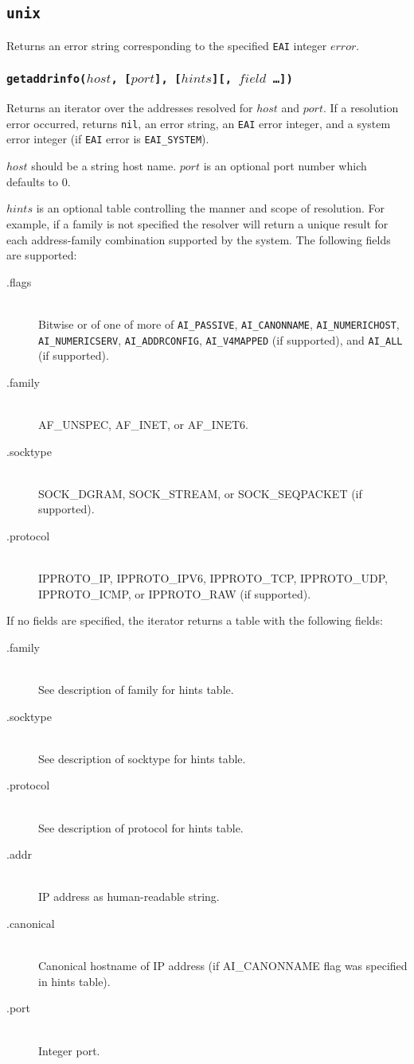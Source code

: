 \documentclass[11pt, oneside]{memoir}
\newcommand*{\nil}[0]{\texttt{nil}\xspace}
\newcommand*{\fn}[1]{\texttt{#1}\xspace}
\newcounter{toccols}
\newenvironment{Module}[1]{
	\subsection{\texttt{#1}}
	\addtocontents{toc}{
		\protect\begin{multicols}{\value{toccols}}
	}
}{
	\addtocontents{toc}{\protect\end{multicols}}
}
\begin{document}
\begin{Module}{unix}
Returns an error string corresponding to the specified \texttt{EAI} integer $error$.

\subsubsection[\fn{getaddrinfo}]{\fn{getaddrinfo($host$, [$port$], [$hints$][, $field$ \ldots])}}

Returns an iterator over the addresses resolved for $host$ and $port$. If a resolution error occurred, returns \nil, an error string, an \texttt{EAI} error integer, and a system error integer (if \texttt{EAI} error is \texttt{EAI\_SYSTEM}).

$host$ should be a string host name. $port$ is an optional port number which defaults to 0.

$hints$ is an optional table controlling the manner and scope of resolution. For example, if a family is not specified the resolver will return a unique result for each address-family combination supported by the system. The following fields are supported:

\begin{description}
\item[.flags] \hfill \\
Bitwise or of one of more of \texttt{AI\_PASSIVE}, \texttt{AI\_CANONNAME}, \texttt{AI\_NUMERICHOST}, \texttt{AI\_NUMERICSERV}, \texttt{AI\_ADDRCONFIG}, \texttt{AI\_V4MAPPED} (if supported), and \texttt{AI\_ALL} (if supported).
\item[.family] \hfill \\
AF\_UNSPEC, AF\_INET, or AF\_INET6.
\item[.socktype] \hfill \\
SOCK\_DGRAM, SOCK\_STREAM, or SOCK\_SEQPACKET (if supported).
\item[.protocol] \hfill \\
IPPROTO\_IP, IPPROTO\_IPV6, IPPROTO\_TCP, IPPROTO\_UDP, IPPROTO\_ICMP, or IPPROTO\_RAW (if supported).
\end{description}

If no fields are specified, the iterator returns a table with the following fields:

\begin{description}
\item[.family] \hfill \\
See description of family for hints table.
\item[.socktype] \hfill \\
See description of socktype for hints table.
\item[.protocol] \hfill \\
See description of protocol for hints table. 
\item[.addr] \hfill \\
IP address as human-readable string.
\item[.canonical] \hfill \\
Canonical hostname of IP address (if AI\_CANONNAME flag was specified in hints table).
\item[.port] \hfill \\
Integer port.
\end{description}


\end{Module}
\end{document}
